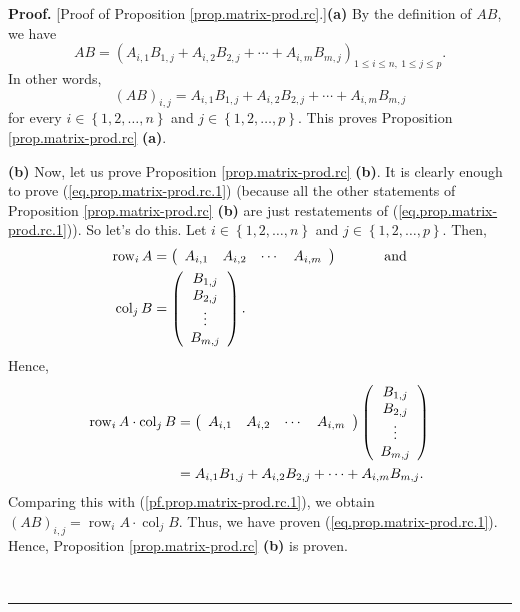 \documentclass[numbers=enddot,12pt,final,onecolumn,notitlepage]{scrartcl}%
\theoremstyle{definition}
\newenvironment{proof}[1][Proof]{\noindent\textbf{#1.} }{\ \rule{0.5em}{0.5em}}
\begin{document}
\begin{proof}
[Proof of Proposition \ref{prop.matrix-prod.rc}.]\textbf{(a)} By the
definition of $AB$, we have%
\[
AB=\left(  A_{i,1}B_{1,j}+A_{i,2}B_{2,j}+\cdots+A_{i,m}B_{m,j}\right)  _{1\leq
i\leq n,\ 1\leq j\leq p}.
\]
In other words,%
\begin{equation}
\left(  AB\right)  _{i,j}=A_{i,1}B_{1,j}+A_{i,2}B_{2,j}+\cdots+A_{i,m}B_{m,j}
\label{pf.prop.matrix-prod.rc.1}%
\end{equation}
for every $i\in\left\{  1,2,\ldots,n\right\}  $ and $j\in\left\{
1,2,\ldots,p\right\}  $. This proves Proposition \ref{prop.matrix-prod.rc}
\textbf{(a)}.

\textbf{(b)} Now, let us prove Proposition \ref{prop.matrix-prod.rc}
\textbf{(b)}. It is clearly enough to prove (\ref{eq.prop.matrix-prod.rc.1})
(because all the other statements of Proposition \ref{prop.matrix-prod.rc}
\textbf{(b)} are just restatements of (\ref{eq.prop.matrix-prod.rc.1})). So
let's do this. Let $i\in\left\{  1,2,\ldots,n\right\}  $ and $j\in\left\{
1,2,\ldots,p\right\}  $. Then,%
\begin{align}
\operatorname*{row}\nolimits_{i}A  &  =\left(
\begin{array}
[c]{cccc}%
A_{i,1} & A_{i,2} & \cdots & A_{i,m}%
\end{array}
\right)  \ \ \ \ \ \ \ \ \ \ \text{and}\label{pf.prop.matrix-prod.rc.row}\\
\operatorname*{col}\nolimits_{j}B  &  =\left(
\begin{array}
[c]{c}%
B_{1,j}\\
B_{2,j}\\
\vdots\\
B_{m,j}%
\end{array}
\right)  . \label{pf.prop.matrix-prod.rc.col}%
\end{align}
Hence,%
\begin{align*}
\operatorname*{row}\nolimits_{i}A\cdot\operatorname*{col}\nolimits_{j}B  &
=\left(
\begin{array}
[c]{cccc}%
A_{i,1} & A_{i,2} & \cdots & A_{i,m}%
\end{array}
\right)  \left(
\begin{array}
[c]{c}%
B_{1,j}\\
B_{2,j}\\
\vdots\\
B_{m,j}%
\end{array}
\right) \\
&  =A_{i,1}B_{1,j}+A_{i,2}B_{2,j}+\cdots+A_{i,m}B_{m,j}.
\end{align*}
Comparing this with (\ref{pf.prop.matrix-prod.rc.1}), we obtain $\left(
AB\right)  _{i,j}=\operatorname*{row}\nolimits_{i}A\cdot\operatorname*{col}%
\nolimits_{j}B$. Thus, we have proven (\ref{eq.prop.matrix-prod.rc.1}). Hence,
Proposition \ref{prop.matrix-prod.rc} \textbf{(b)} is proven.


\end{proof}
\end{document}
